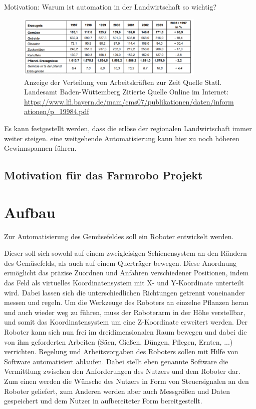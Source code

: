 \documentclass[]{article}
\begin{document}
Motivation:
Warum ist automation in der Landwirtschaft so wichtig?

	\begin{figure}[H]
	\centering
	\includegraphics[width=0.8\textwidth]{Tabelle_Daten_Produktion.PNG}
	\caption{Anzeige der Verteilung von Arbeitskräften zur Zeit \newline
		Quelle Statl. Landesamt Baden-Wüttemberg Zitierte Quelle Online im Internet:
		\url{ https://www.lfl.bayern.de/mam/cms07/publikationen/daten/informationen/p_19984.pdf}}
	\label{img:grafik-dummy}
	
\end{figure} 

Es kann festgestellt werden, dass die erlöse der regionalen Landwirtschaft immer weiter steigen. eine weitgehende Automatisierung kann hier zu noch höheren Gewinnspannen führen.

\subsection{Motivation für das Farmrobo Projekt}

\section{Aufbau}

Zur Automatisierung des Gemüsefeldes soll ein Roboter entwickelt werden.

Dieser soll sich sowohl auf einem zweigleisigen Schienensystem an den Rändern des Gemüsefelds, als auch auf einem Querträger bewegen. Diese Anordnung ermöglicht das präzise Zuordnen und Anfahren verschiedener Positionen, indem das Feld als virtuelles Koordinatensystem mit X- und Y-Koordinate unterteilt wird. Dabei lassen sich die unterschiedlichen Richtungen getrennt voneinander messen und regeln. 
Um die Werkzeuge des Roboters an einzelne Pflanzen heran und auch wieder weg zu führen, muss der Roboterarm in der Höhe verstellbar, und somit das Koordinatensystem um eine Z-Koordinate erweitert werden. Der Roboter kann sich nun frei im dreidimensionalen Raum bewegen und dabei die von ihm geforderten Arbeiten (Säen, Gießen, Düngen, Pflegen, Ernten, ...) verrichten. 
Regelung und Arbeitsvorgaben des Roboters sollen mit Hilfe von Software automatisiert ablaufen. Dabei stellt eben genannte Software die Vermittlung zwischen den Anforderungen des Nutzers und dem Roboter dar. Zum einen werden die Wünsche des Nutzers in Form von Steuersignalen an den Roboter geliefert, zum Anderen werden aber auch Messgrößen und Daten gespeichert und dem Nutzer in aufbereiteter Form bereitgestellt. 
\end{document}
